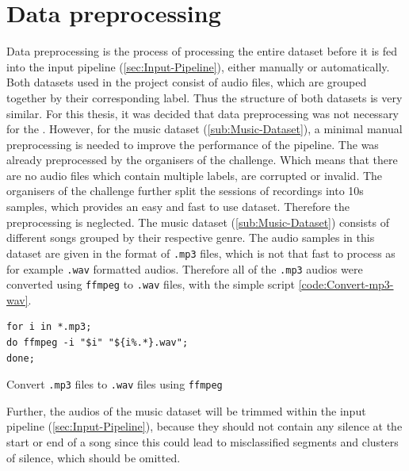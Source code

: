 \section{Data preprocessing}
\label{sec:Data-Preprocessing}
Data preprocessing is the process of processing the entire dataset before it is fed into the input pipeline (\ref{sec:Input-Pipeline}), either manually or automatically. Both datasets used in the project consist of audio files, which are grouped together by their corresponding label. Thus the structure of both datasets is very similar. For this thesis, it was decided that data preprocessing was not necessary for the . However, for the music dataset (\ref{sub:Music-Dataset}), a minimal manual preprocessing is needed to improve the performance of the pipeline.
\newline
\newline
The  was already preprocessed by the organisers of the challenge. Which means that there are no audio files which contain multiple labels, are corrupted or invalid. The organisers of the challenge further split the sessions of recordings into 10s samples, which provides an easy and fast to use dataset. Therefore the preprocessing is neglected.
\newline
\newline
The music dataset (\ref{sub:Music-Dataset}) consists of different songs grouped by their respective genre. The audio samples in this dataset are given in the format of \texttt{.mp3} files, which is not that fast to process as for example \texttt{.wav} formatted audios. Therefore all of the \texttt{.mp3} audios were converted using \texttt{ffmpeg} to \texttt{.wav} files, with the simple script \ref{code:Convert-mp3-wav}.
\begin{code}[htbp]
\begin{verbatim}
for i in *.mp3; 
do ffmpeg -i "$i" "${i%.*}.wav";
done;
\end{verbatim}
\caption{Convert \texttt{.mp3} files to \texttt{.wav} files using \texttt{ffmpeg}}
\label{code:Convert-mp3-wav}
\end{code}
Further, the audios of the music dataset will be trimmed within the input pipeline (\ref{sec:Input-Pipeline}), because they should not contain any silence at the start or end of a song since this could lead to misclassified segments and clusters of silence, which should be omitted.

